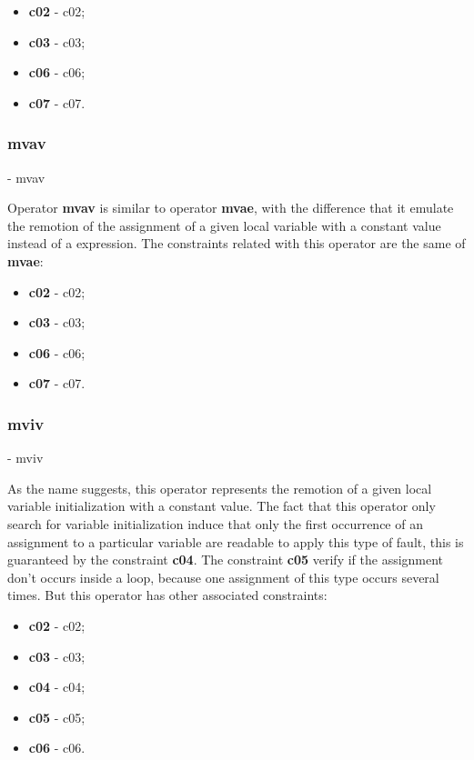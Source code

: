	\begin{itemize}
		\item \textbf{\acs{c02}} - \Acl{c02};
		\item \textbf{\acs{c03}} - \Acl{c03};
		\item \textbf{\acs{c06}} - \Acl{c06};
		\item \textbf{\acs{c07}} - \Acl{c07}.
	\end{itemize}

	\subsubsection{\textbf{\acs{mvav}}} - \Acl{mvav}
	\hypertarget{mvav}{}

	Operator \textbf{\ac{mvav}} is similar to operator \textbf{\ac{mvae}}, with the difference that it emulate the remotion of the assignment of a given local variable with a constant value instead of a expression. The constraints related with this operator are the same of \textbf{\ac{mvae}}:

	\begin{itemize}
		\item \textbf{\acs{c02}} - \Acl{c02};
		\item \textbf{\acs{c03}} - \Acl{c03};
		\item \textbf{\acs{c06}} - \Acl{c06};
		\item \textbf{\acs{c07}} - \Acl{c07}.
	\end{itemize}

	\subsubsection{\textbf{\acs{mviv}}} - \Acl{mviv}
	\hypertarget{mviv}{}

	As the name suggests, this operator represents the remotion of a given local variable initialization with a constant value. The fact that this operator only search for variable initialization induce that only the first occurrence of an assignment to a particular variable are readable to apply this type of fault, this is guaranteed by the constraint \textbf{\acs{c04}}. The constraint \textbf{\acs{c05}} verify if the assignment don't occurs inside a loop, because one assignment of this type occurs several times. But this operator has other associated constraints:

	\begin{itemize}
		\item \textbf{\acs{c02}} - \Acl{c02};
		\item \textbf{\acs{c03}} - \Acl{c03};
		\item \textbf{\acs{c04}} - \Acl{c04};
		\item \textbf{\acs{c05}} - \Acl{c05};
		\item \textbf{\acs{c06}} - \Acl{c06}.
	\end{itemize}


